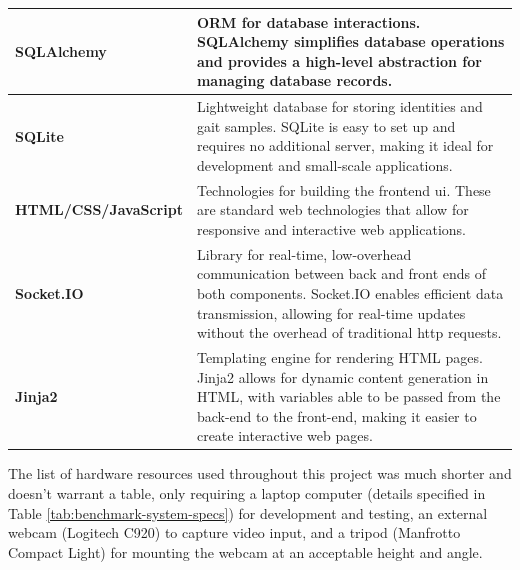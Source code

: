 \begin{scriptsize}
\begin{xltabular}{\textwidth}{|p{0.25\textwidth}|X|}
        \textbf{SQLAlchemy}          & ORM for database interactions. SQLAlchemy simplifies database operations and provides a high-level abstraction for managing database records.                                                           \\ \hline
        \textbf{SQLite}              & Lightweight database for storing identities and gait samples. SQLite is easy to set up and requires no additional server, making it ideal for development and small-scale applications.                 \\ \hline
        \textbf{HTML/CSS/JavaScript} & Technologies for building the frontend \ac{ui}. These are standard web technologies that allow for responsive and interactive web applications.                                                  \\ \hline
        \textbf{Socket.IO}           & Library for real-time, low-overhead communication between back and front ends of both components. Socket.IO enables efficient data transmission, allowing for real-time updates without the overhead of traditional \ac{http} requests.         \\ \hline
        \textbf{Jinja2}              & Templating engine for rendering HTML pages. Jinja2 allows for dynamic content generation in HTML, with variables able to be passed from the back-end to the front-end, making it easier to create interactive web pages.                                                     \\
    \end{xltabular}
\end{scriptsize}

The list of hardware resources used throughout this project was much shorter and doesn't warrant a table, only requiring a laptop computer (details specified in Table \ref{tab:benchmark-system-specs}) for development and testing, an external webcam (Logitech C920) to capture video input, and a tripod (Manfrotto Compact Light) for mounting the webcam at an acceptable height and angle.
